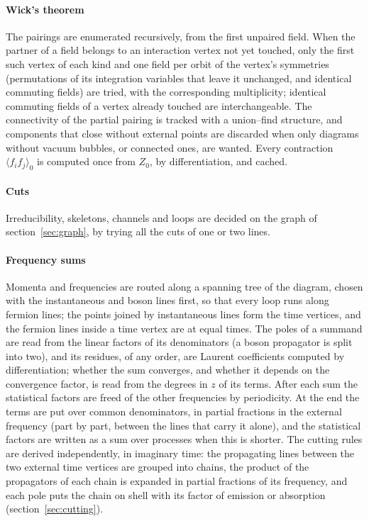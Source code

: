 \documentclass[11pt,a4paper]{article}
\begin{document}
\paragraph{Wick's theorem} The pairings are enumerated recursively, from the first unpaired field. When the partner of a
field belongs to an interaction vertex not yet touched, only the first such vertex of each kind and one field per orbit of
the vertex's symmetries (permutations of its integration variables that leave it unchanged, and identical commuting
fields) are tried, with the corresponding multiplicity; identical commuting fields of a vertex already touched are
interchangeable. The connectivity of the partial pairing is tracked with a union--find structure, and components that
close without external points are discarded when only diagrams without vacuum bubbles, or connected ones, are wanted.
Every contraction $\langle f_if_j\rangle_0$ is computed once from $Z_0$, by differentiation, and cached.

\paragraph{Cuts} Irreducibility, skeletons, channels and loops are decided on the graph of section~\ref{sec:graph}, by
trying all the cuts of one or two lines.

\paragraph{Frequency sums} Momenta and frequencies are routed along a spanning tree of the diagram, chosen with the
instantaneous and boson lines first, so that every loop runs along fermion lines; the points joined by instantaneous
lines form the time vertices, and the fermion lines inside a time vertex are at equal times. The poles of a summand are
read from the linear factors of its denominators (a boson propagator is split into two), and its residues, of any
order, are Laurent coefficients computed by differentiation; whether the sum converges, and whether it depends on the
convergence factor, is read from the degrees in $z$ of its terms. After each sum the statistical factors are freed of
the other frequencies by periodicity. At the end the terms are put over common denominators, in partial fractions in the
external frequency (part by part, between the lines that carry it alone), and the statistical factors are written as a
sum over processes when this is shorter. The cutting rules are derived independently, in imaginary time: the
propagating lines between the two external time vertices are grouped into chains, the product of the propagators of
each chain is expanded in partial fractions of its frequency, and each pole puts the chain on shell with its factor of
emission or absorption (section~\ref{sec:cutting}).
\end{document}
